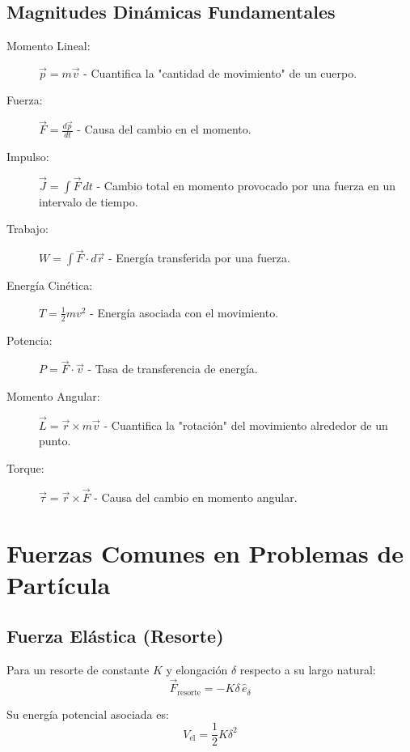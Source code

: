 \subsection*{Magnitudes Dinámicas Fundamentales}

\begin{description}

    \item[Momento Lineal:] $\vec{p} = m\vec{v}$ - Cuantifica la "cantidad de movimiento" de un cuerpo.

    \item[Fuerza:] $\vec{F} = \frac{d\vec{p}}{dt}$ - Causa del cambio en el momento.

    \item[Impulso:] $\vec{J} = \int \vec{F} \, dt$ - Cambio total en momento provocado por una fuerza en un intervalo de tiempo.

    \item[Trabajo:] $W = \int \vec{F} \cdot d\vec{r}$ - Energía transferida por una fuerza.

    \item[Energía Cinética:] $T = \frac{1}{2}m v^2$ - Energía asociada con el movimiento.

    \item[Potencia:] $P = \vec{F} \cdot \vec{v}$ - Tasa de transferencia de energía.

    \item[Momento Angular:] $\vec{L} = \vec{r} \times m\vec{v}$ - Cuantifica la "rotación" del movimiento alrededor de un punto.

    \item[Torque:] $\vec{\tau} = \vec{r} \times \vec{F}$ - Causa del cambio en momento angular.

\end{description}

\section{Fuerzas Comunes en Problemas de Partícula}

\subsection*{Fuerza Elástica (Resorte)}

Para un resorte de constante $K$ y elongación $\delta$ respecto a su largo natural:
$$\vec{F}_{\text{resorte}} = -K\delta \, \hat{e}_{\delta}$$

Su energía potencial asociada es:
$$V_{\text{el}} = \frac{1}{2}K\delta^2$$

